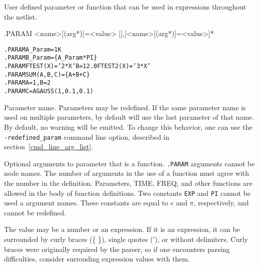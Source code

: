



User defined parameter or function that can be used in expressions throughout the netlist.

\begin{Command}

\format
.PARAM <name>[(arg*)]=<value> [[,]<name>[(arg*)]=<value>]* 

\examples
\begin{alltt}
.PARAM A_Param=1K
.PARAM B_Param=\{A_Param*PI\}
.PARAM FTEST(X)='2*X' B=12.0 FTEST2(X)='3*X'
.PARAM SUM(A,B,C)=\{A+B+C\}
.PARAM A=1, B=2
.PARAM C=AGAUSS(1,0.1,0.1)
\end{alltt}

\arguments

\begin{Arguments}


Parameter name.  Parameters may be redefined.  
If the same parameter name is used on multiple parameters, \Xyce{} by default will use the last parameter of that name.  By default, no warning will be emitted.
To change this behavior, one can use the \texttt{-redefined\_param} command line option, described in section~\ref{cmd_line_arg_list}.


Optional arguments to parameter that is a function.  \texttt{.PARAM} arguments cannot be node names.
The number of arguments in the use of a function must agree with the number 
in the definition. Parameters, TIME, FREQ, and other functions are allowed in 
the body of function definitions.  
Two constants \texttt{EXP} and \texttt{PI} cannot
be used a argument names.  These constants are equal to $e$ and $\pi$, respectively,
and cannot be redefined.


The value may be a number or an expression.  If it is an expression, it can be surrounded 
by curly braces (\{ \}), single quotes ('), or without delimiters.  Curly braces were originally 
required by the \Xyce{} parser, so if one encounters parsing difficulties, consider 
surrouding expression values with them.


\end{Arguments}
\end{Command}
